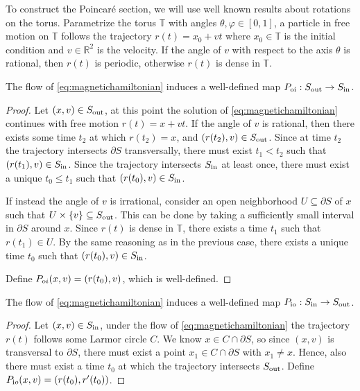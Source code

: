 
To construct the Poincar\'e section, we will use well known results about rotations on the torus. Parametrize the torus $\mathbb T$ with angles $\theta,\varphi\in[0,1]$, a particle in free motion on $\mathbb T$ follows the trajectory $r(t)=x_0+vt$ where $x_0\in\mathbb T$ is the initial condition and $v\in\mathbb R^2$ is the velocity. If the angle of $v$ with respect to the axis $\theta$ is rational, then $r(t)$ is periodic, otherwise $r(t)$ is dense in $\mathbb T$.

\begin{lemma}\label{lem:SoutToSin}
The flow of \eqref{eq:magnetichamiltonian} induces a well-defined map $P_\text{oi}:S_\text{out}\to S_\text{in}$.
\end{lemma}
\begin{proof}
Let $(x,v)\in S_\text{out}$, at this point the solution of \eqref{eq:magnetichamiltonian} continues with free motion $r(t)=x+vt$. If the angle of $v$ is rational, then there exists some time $t_2$ at which $r(t_2)=x$, and $(r(t_2),v)\in S_\text{out}$. Since at time $t_2$ the trajectory intersects $\partial S$ transversally, there must exist $t_1<t_2$ such that $(r(t_1),v)\in S_\text{in}$. Since the trajectory intersects $S_\text{in}$ at least once, there must exist a unique $t_0\le t_1$ such that $(r(t_0),v)\in S_\text{in}$.

If instead the angle of $v$ is irrational, consider an open neighborhood $U\subseteq \partial S$ of $x$ such that $U\times\{v\}\subseteq S_\text{out}$. This can be done by taking a sufficiently small interval in $\partial S$ around $x$. Since $r(t)$ is dense in $\mathbb T$, there exists a time $t_1$ such that $r(t_1)\in U$. By the same reasoning as in the previous case, there exists a unique time $t_0$ such that $(r(t_0),v)\in S_\text{in}$.

Define $P_{\text oi}(x,v) = (r(t_0), v)$, which is well-defined.
\end{proof}

\begin{lemma}\label{lem:SinToSout}
The flow of \eqref{eq:magnetichamiltonian} induces a well-defined map $P_\text{io}:S_\text{in}\to S_\text{out}$.
\end{lemma}
\begin{proof}
Let $(x,v)\in S_\text{in}$, under the flow of \eqref{eq:magnetichamiltonian} the trajectory $r(t)$ follows some Larmor circle $C$. We know $x\in C\cap \partial S$, so since $(x,v)$ is transversal to $\partial S$, there must exist a point $x_1\in C\cap\partial S$ with $x_1\neq x$. Hence, also there must exist a time $t_0$ at which the trajectory intersects $S_\text{out}$. Define $P_{\text io}(x,v) = (r(t_0), r'(t_0))$.
\end{proof}

